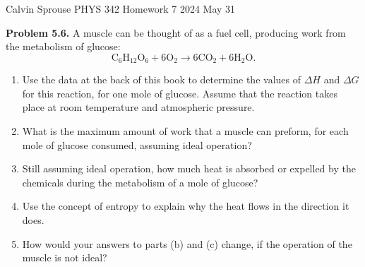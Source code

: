 \documentclass[a4paper, 12pt]{config/homework}
\begin{document}
\noindent
Calvin Sprouse \hfill PHYS 342 Homework 7 \hfill 2024 May 31
\bigskip

\bigskip\noindent
\textbf{Problem 5.6.} A muscle can be thought of as a fuel cell, producing work from the metabolism of glucose:
\[\text{C}_6\text{H}_{12}\text{O}_6 + 6\text{O}_2 \longrightarrow 6\text{CO}_2 + 6\text{H}_2\text{O}.\]
\begin{enumerate}[label=\textbf{(\alph*)}]
\item Use the data at the back of this book to determine the values of \(\Delta H\) and \(\Delta G\) for this reaction, for one mole of glucose. Assume that the reaction takes place at room temperature and atmospheric pressure.
\item What is the maximum amount of work that a muscle can preform, for each mole of glucose consumed, assuming ideal operation?
\item Still assuming ideal operation, how much heat is absorbed or expelled by the chemicals during the metabolism of a mole of glucose?
\item Use the concept of entropy to explain why the heat flows in the direction it does.
\item How would your answers to parts (b) and (c) change, if the operation of the muscle is not ideal?
\end{enumerate}
\end{document}
